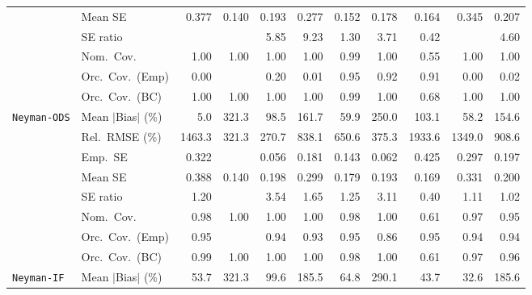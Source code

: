 \begin{landscape}
\begin{longtable}{llrrrrrrrrr}
 & Mean SE & 0.377 & 0.140 & 0.193 & 0.277 & 0.152 & 0.178 & 0.164 & 0.345 & 0.207 \\
 & SE ratio &  &  & 5.85 & 9.23 & \cellcolor{rankone}1.30 & \cellcolor{rankthree}3.71 & \cellcolor{ranktwo}0.42 &  & 4.60 \\
 & Nom.\ Cov. & \cellcolor{ranktwo}1.00 & \cellcolor{ranktwo}1.00 & \cellcolor{ranktwo}1.00 & \cellcolor{ranktwo}1.00 & \cellcolor{rankone}0.99 & \cellcolor{ranktwo}1.00 & \cellcolor{rankthree}0.55 & \cellcolor{ranktwo}1.00 & \cellcolor{ranktwo}1.00 \\
 & Orc.\ Cov.\ (Emp) & 0.00 &  & 0.20 & 0.01 & \cellcolor{rankone}0.95 & \cellcolor{ranktwo}0.92 & \cellcolor{rankthree}0.91 & 0.00 & 0.02 \\
 & Orc.\ Cov.\ (BC) & \cellcolor{ranktwo}1.00 & \cellcolor{ranktwo}1.00 & \cellcolor{ranktwo}1.00 & \cellcolor{ranktwo}1.00 & \cellcolor{rankone}0.99 & \cellcolor{ranktwo}1.00 & \cellcolor{rankthree}0.68 & \cellcolor{ranktwo}1.00 & \cellcolor{ranktwo}1.00 \\
\addlinespace[2pt]
\quad \texttt{Neyman-ODS} & Mean $|$Bias$|$ (\%) & \cellcolor{rankone}5.0 & 321.3 & 98.5 & 161.7 & \cellcolor{rankthree}59.9 & 250.0 & 103.1 & \cellcolor{ranktwo}58.2 & 154.6 \\
 & Rel.\ RMSE (\%) & 1463.3 & \cellcolor{ranktwo}321.3 & \cellcolor{rankone}270.7 & 838.1 & 650.6 & \cellcolor{rankthree}375.3 & 1933.6 & 1349.0 & 908.6 \\
 & Emp.\ SE & 0.322 &  & 0.056 & 0.181 & 0.143 & 0.062 & 0.425 & 0.297 & 0.197 \\
 & Mean SE & 0.388 & 0.140 & 0.198 & 0.299 & 0.179 & 0.193 & 0.169 & 0.331 & 0.200 \\
 & SE ratio & \cellcolor{rankthree}1.20 &  & 3.54 & 1.65 & 1.25 & 3.11 & 0.40 & \cellcolor{ranktwo}1.11 & \cellcolor{rankone}1.02 \\
 & Nom.\ Cov. & \cellcolor{rankthree}0.98 & 1.00 & 1.00 & 1.00 & \cellcolor{rankthree}0.98 & 1.00 & 0.61 & \cellcolor{ranktwo}0.97 & \cellcolor{rankone}0.95 \\
 & Orc.\ Cov.\ (Emp) & \cellcolor{rankone}0.95 &  & \cellcolor{ranktwo}0.94 & \cellcolor{rankthree}0.93 & \cellcolor{rankone}0.95 & 0.86 & \cellcolor{rankone}0.95 & \cellcolor{ranktwo}0.94 & \cellcolor{ranktwo}0.94 \\
 & Orc.\ Cov.\ (BC) & 0.99 & 1.00 & 1.00 & 1.00 & \cellcolor{rankthree}0.98 & 1.00 & 0.61 & \cellcolor{ranktwo}0.97 & \cellcolor{rankone}0.96 \\
\addlinespace[2pt]
\quad \texttt{Neyman-IF} & Mean $|$Bias$|$ (\%) & \cellcolor{rankthree}53.7 & 321.3 & 99.6 & 185.5 & 64.8 & 290.1 & \cellcolor{ranktwo}43.7 & \cellcolor{rankone}32.6 & 185.6 \\

\end{longtable}
\end{landscape}
